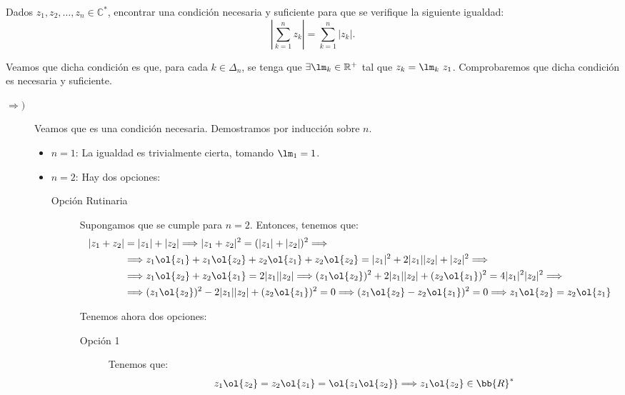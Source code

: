 \begin{ejercicio}
    Dados $z_1, z_2, \ldots, z_n \in \mathbb{C}^*$, encontrar una condición necesaria y suficiente para que se verifique la siguiente igualdad:
    \[
        \left|\sum_{k=1}^n z_k\right| = \sum_{k=1}^n |z_k|.
    \]

    Veamos que dicha condición es que, para cada $k\in \Delta_n$, se tenga que $\exists \lm_k\in \mathbb{R}^+$ tal que $z_k = \lm_k~z_1$. Comprobaremos que dicha condición es necesaria y suficiente.
    \begin{description}
        \item[$\Longrightarrow)$] Veamos que es una condición necesaria. Demostramos por inducción sobre $n$.
        \begin{itemize}
            \item \ul{$n=1$}: La igualdad es trivialmente cierta, tomando $\lm_1 = 1$.
            
            \item \ul{$n=2$}: Hay dos opciones:
            \begin{description}
                \item[Opción Rutinaria]
                
                Supongamos que se cumple para $n=2$. Entonces, tenemos que:
            \begin{align*}
                |z_1+z_2| &= |z_1| + |z_2| \Longrightarrow
                |z_1+z_2|^2 = (|z_1| + |z_2|)^2 \Longrightarrow\\&\Longrightarrow
                z_1\ol{z_1} + z_1\ol{z_2} + z_2\ol{z_1} + z_2\ol{z_2} = |z_1|^2 + 2|z_1||z_2| + |z_2|^2 \Longrightarrow\\&\Longrightarrow
                z_1\ol{z_2} + z_2\ol{z_1} = 2|z_1||z_2|
                \Longrightarrow (z_1\ol{z_2})^2 + 2|z_1||z_2| + (z_2\ol{z_1})^2 = 4|z_1|^2|z_2|^2
                \Longrightarrow\\&\Longrightarrow
                (z_1\ol{z_2})^2 - 2|z_1||z_2| + (z_2\ol{z_1})^2 = 0
                \Longrightarrow
                (z_1\ol{z_2} - z_2\ol{z_1})^2 = 0
                \Longrightarrow
                z_1\ol{z_2} = z_2\ol{z_1}
            \end{align*}

            Tenemos ahora dos opciones:
            \begin{description}
                \item[Opción 1]
                
                Tenemos que:
                \begin{equation*}
                    z_1\ol{z_2} = z_2\ol{z_1}=\ol{z_1\ol{z_2}} \Longrightarrow
                    z_1\ol{z_2}\in \bb{R}^*
                \end{equation*}


\end{description}
\end{description}
\end{itemize}
\end{description}
\end{ejercicio}
